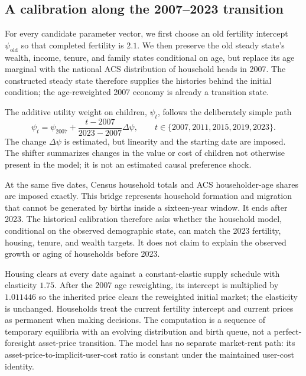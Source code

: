 \documentclass[11pt]{article}
\theoremstyle{definition}
\newcommand{\1}{\mathbf 1}
\begin{document}
\subsection{A calibration along the 2007--2023 transition}

For every candidate parameter vector, we first choose an old fertility
intercept \(\psi_{\mathrm{old}}\) so that completed fertility is \(2.1\). We
then preserve the old steady state's wealth, income, tenure, and family states
conditional on age, but replace its age marginal with the national ACS
distribution of household heads in 2007. The constructed steady state therefore
supplies the histories behind the initial condition; the age-reweighted 2007
economy is already a transition state.

The additive utility weight on children, \(\psi_t\), follows the deliberately
simple path
\begin{equation}
 \psi_t=\psi_{2007}
 +\frac{t-2007}{2023-2007}\Delta\psi,
 \qquad t\in\{2007,2011,2015,2019,2023\}.
 \label{eq:dated_preference_path}
\end{equation}
The change \(\Delta\psi\) is estimated, but linearity and the starting date are
imposed. The shifter summarizes changes in the value or cost of children not
otherwise present in the model; it is not an estimated causal preference
shock.

At the same five dates, Census household totals and ACS householder-age shares
are imposed exactly. This bridge represents household formation and migration
that cannot be generated by births inside a sixteen-year window. It ends after
2023. The historical calibration therefore asks whether the household model,
conditional on the observed demographic state, can match the 2023 fertility,
housing, tenure, and wealth targets. It does not claim to explain the observed
growth or aging of households before 2023.

Housing clears at every date against a constant-elastic supply schedule with
elasticity \(1.75\). After the 2007 age reweighting, its intercept is multiplied
by \(1.011446\) so the inherited price clears the reweighted initial market;
the elasticity is unchanged. Households treat the current fertility intercept
and current prices as permanent when making decisions. The computation is a
sequence of temporary equilibria with an evolving distribution and birth
queue, not a perfect-foresight asset-price transition. The model has no
separate market-rent path: its asset-price-to-implicit-user-cost ratio is
constant under the maintained user-cost identity.
\end{document}
